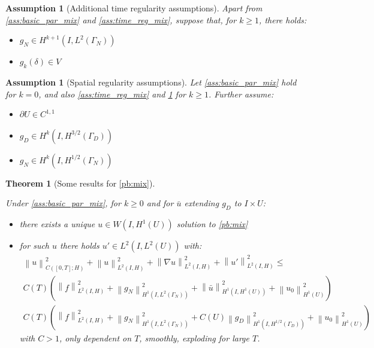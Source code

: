 \documentclass[english,a4paper,10pt,oneside]{scrbook}	%
\theoremstyle{break}
\newtheorem{thm}[equation]{Theorem}
\newtheorem{ass}[equation]{Assumption}
\theoremstyle{remark}
\newcommand{\norm}[1]{\left\lVert#1\right\rVert}
\begin{document}
\begin{appendices}
\begin{ass}[Additional time regularity assumptions]
\label{ass:add_time_reg_mix}
Apart from \cref{ass:basic_par_mix} and \cref{ass:time_reg_mix}, suppose that, for $k\geq 1$, there holds:

\begin{itemize}
	\item $g_N \in H^{k+1}(I, L^2(\Gamma_N))$
	\item $g_k(\delta)  \in V$
\end{itemize} 
\end{ass}


\begin{ass}[Spatial regularity assumptions]
\label{ass:space_reg_mix}
Let \cref{ass:basic_par_mix} hold for $k=0$, and also \cref{ass:time_reg_mix} and \cref{ass:add_time_reg_mix} for $k\geq 1$. Further assume:

\begin{itemize}
	\item $\partial U \in C^{1,1}$
	\item $g_D \in H^k(I,H^{3/2}(\Gamma_D))$
	\item $g_N \in H^k(I,H^{1/2}(\Gamma_N))$
\end{itemize}

\end{ass}


\begin{thm}[Some results for \cref{pb:mix}]
\label{thm:mix_reg}

Under \cref{ass:basic_par_mix}, for $k \geq 0$ and for $\bar{u}$ extending $g_D$ to $I\times U$:

\begin{itemize}
	\item there exists a unique $u \in W(I,H^1(U))$ solution to \cref{pb:mix}
	\item for such $u$ there holds $u' \in L^2(I,L^2(U))$ with:
	\begin{align*}
	\norm{u}_{C([0,T];H)}^2+\norm{u}^2_{L^2(I,H)}+\norm{\nabla u}^2_{L^2(I,H)} + \norm{u'}^2_{L^2(I,H)} \leq \\
	C(T)\left (  \norm{f}_{L^2(I,H)}^2 +  \norm{g_N}^2_{H^1(I,L^2(\Gamma_N))}   + \norm{\bar{u}}^2_{H^1(I,H^1(U))} + \norm{u_0}^2_{H^1(U)}\right )\\
	C(T)\left (  \norm{f}_{L^2(I,H)}^2 +  \norm{g_N}^2_{H^1(I,L^2(\Gamma_N))}   + C(U) \norm{g_D}^2_{H^1(I,H^{1/2}(\Gamma_D))} + \norm{u_0}^2_{H^1(U)}\right )
\end{align*}with $C>1$, only dependent on $T$, smoothly, exploding for large $T$.
\end{itemize}


\end{thm}
\end{appendices}
\end{document}
